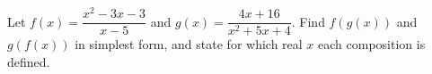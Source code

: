 Let $f(x)=\dfrac{x^2-3x-3}{x-5}$ and $g(x)=\dfrac{4x+16}{x^2+5x+4}$. Find $f(g(x))$ and $g(f(x))$ in simplest form, and state for which real $x$ each composition is defined.
